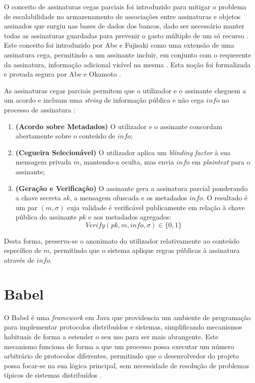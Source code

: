 O conceito de assinaturas cegas parciais foi introduzido para mitigar o problema de escalabilidade no armazenamento de associações entre assinaturas e objetos assinados que surgiu nas bases de dados dos bancos, dado ser necessário manter todas as assinaturas guardadas para prevenir o gasto múltiplo de um só recurso \cite{ieee4533332_blindsig}. Este conceito foi introduzido por Abe e Fujisaki \cite{abefujisaki1996date} como uma extensão de uma assinatura cega, permitindo a um assinante incluir, em conjunto com o requerente da assinatura, informação adicional visível na mesma \cite{kastner2022abeokamoto}. Esta noção foi formalizada e provada segura por Abe e Okamoto \cite{abeokamoto2000partial}.

As assinaturas cegas parciais permitem que o utilizador e o assinante cheguem a um acordo e incluam uma \textit{string} de informação pública e não cega $info$ no processo de assinatura \cite{kastner2022abeokamoto}:

\begin{enumerate}
    \item \textbf{(Acordo sobre Metadados)} O utilizador e o assinante concordam abertamente sobre o conteúdo de $info$;
    \item \textbf{(Cegueira Selecionável)} O utilizador aplica um \textit{blinding factor} à sua mensagem privada $m$, mantendo-a oculta, mas envia $info$ em \textit{plaintext} para o assinante;
    \item \textbf{(Geração e Verificação)} O assinante gera a assinatura parcial ponderando a chave secreta $sk$, a mensagem ofuscada e os metadados $info$. O resultado é um par $(m, \sigma)$ cuja validade é verificável publicamente em relação à chave pública do assinante $pk$ e aos metadados agregados:
    \begin{equation*}
        Verify(pk, m, info, \sigma) \in \{0, 1\}
    \end{equation*}
\end{enumerate}

Desta forma, preserva-se o anonimato do utilizador relativamente ao conteúdo específico de $m$, permitindo que o sistema aplique regras públicas à assinatura através de $info$.

\section{Babel}

O Babel \cite{fouto2022babel} é uma \textit{framework} em Java que providencia um ambiente de programação para implementar protocolos distribuídos e sistemas, simplificando mecanismos habituais de forma a estender o seu uso para ser mais abrangente. Este mecanismo funciona de forma a que um processo possa executar um número arbitrário de protocolos diferentes, permitindo que o desenvolvedor do projeto possa focar-se na sua lógica principal, sem necessidade de resolução de problemas típicos de sistemas distribuídos \cite{fouto2022babel}.

